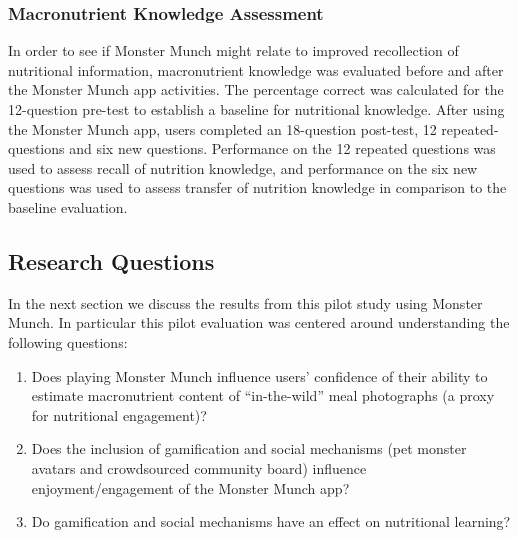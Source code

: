 \subsubsection{Macronutrient Knowledge Assessment}
In order to see if Monster Munch might relate to improved recollection of nutritional information, macronutrient knowledge was evaluated before and after the Monster Munch app activities. The percentage correct was calculated for the 12-question pre-test to establish a baseline for nutritional knowledge. After using the Monster Munch app, users completed an 18-question post-test, 12 repeated-questions and six new questions. Performance on the 12 repeated questions was used to assess recall of nutrition knowledge, and performance on the six new questions was used to assess transfer of nutrition knowledge in comparison to the baseline evaluation. 
\vspace{-5pt}
\subsection{Research Questions}
In the next section we discuss the results from this pilot study using Monster Munch. In particular this pilot evaluation was centered around understanding the following questions:
\begin{enumerate}
    \item Does playing Monster Munch influence users' confidence of their ability to estimate macronutrient content of ``in-the-wild'' meal photographs (a proxy for nutritional engagement)?
    \item Does the inclusion of gamification and social mechanisms (pet monster avatars and crowdsourced community board) influence enjoyment/engagement of the Monster Munch app?
    \item Do gamification and social mechanisms have an effect on nutritional learning?
\end{enumerate}



 



